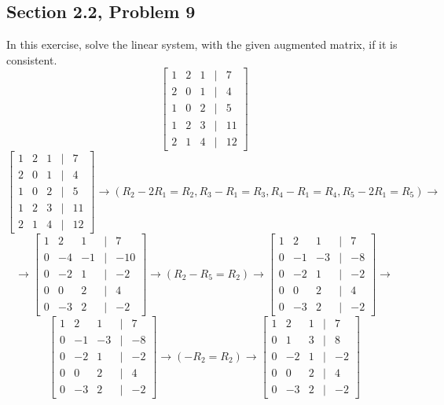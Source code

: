 \documentclass[letterpaper]{report}
\begin{document}
\subsection{Section 2.2, Problem 9}%
\label{sub:Section 2.2, Problem 9}
In this exercise, solve the linear system, with the given augmented matrix, if it is consistent.
\[
\begin{bmatrix} 
    1 & 2 & 1 & | & 7 \\
    2 & 0 & 1 & | & 4 \\
    1 & 0 & 2 & | & 5 \\
    1 & 2 & 3 & | & 11 \\
    2 & 1 & 4 & | & 12 
\end{bmatrix} 
\]
\[
\begin{bmatrix} 
    1 & 2 & 1 & | & 7 \\
    2 & 0 & 1 & | & 4 \\
    1 & 0 & 2 & | & 5 \\
    1 & 2 & 3 & | & 11 \\
    2 & 1 & 4 & | & 12 
\end{bmatrix} \to 
(R_2 - 2R_1 = R_2, R_3 - R_1 = R_3, R_4 - R_1 = R_4, R_5 - 2R_1 = R_5) \to \]\[ \to
\begin{bmatrix} 
    1 & 2 & 1 & | & 7 \\
    0 & -4 & -1 & | & -10 \\ 
    0 & -2 & 1 & | & -2 \\
    0 & 0 & 2 & | & 4 \\
    0 & -3 & 2 & | & -2
\end{bmatrix} \to  (R_2 - R_5 = R_2) \to 
\begin{bmatrix} 
    1 & 2 & 1 & | & 7 \\
    0 & -1 & -3 & | & -8 \\
    0 & -2 & 1 & | & -2 \\
    0 & 0 & 2 & | & 4 \\
    0 & -3 & 2 & | & -2
\end{bmatrix} \to 
\] 
\[
\begin{bmatrix} 
    1 & 2 & 1 & | & 7 \\
    0 & -1 & -3 & | & -8 \\
    0 & -2 & 1 & | & -2 \\
    0 & 0 & 2 & | & 4 \\
    0 & -3 & 2 & | & -2
\end{bmatrix} 
\to (-R_2 = R_2) \to 
\begin{bmatrix} 
    1 & 2 & 1 & | & 7 \\
    0 & 1 & 3 & | & 8 \\
    0 & -2 & 1 & | & -2 \\
    0 & 0 & 2 & | & 4 \\
    0 & -3 & 2 & | & -2
\end{bmatrix} 
\]
\end{document}
